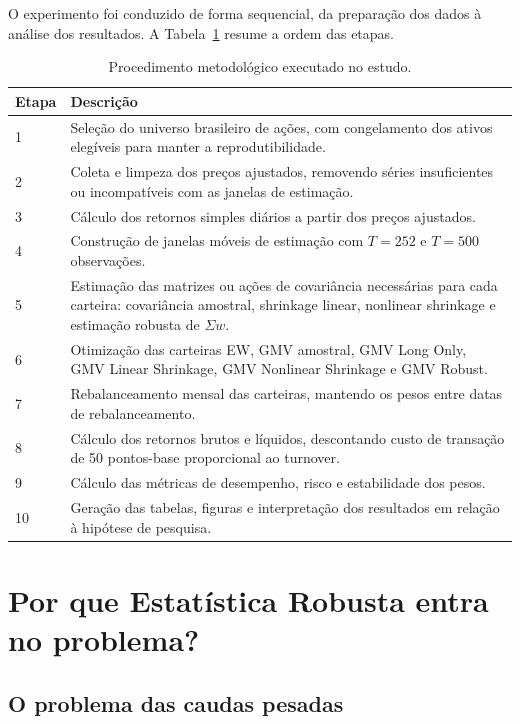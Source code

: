 \documentclass[12pt,a4paper]{article}
\begin{document}
O experimento foi conduzido de forma sequencial, da preparação dos dados à análise dos
resultados. A Tabela~\ref{tab:procedimento-metodologico} resume a ordem das etapas.

\begin{longtable}{p{}p{}}
\caption{Procedimento metodológico executado no estudo.}
\label{tab:procedimento-metodologico}\\
\toprule
\textbf{Etapa} & \textbf{Descrição} \\
\midrule
1 & Seleção do universo brasileiro de ações, com congelamento dos ativos elegíveis para manter a reprodutibilidade. \\
2 & Coleta e limpeza dos preços ajustados, removendo séries insuficientes ou incompatíveis com as janelas de estimação. \\
3 & Cálculo dos retornos simples diários a partir dos preços ajustados. \\
4 & Construção de janelas móveis de estimação com $T=252$ e $T=500$ observações. \\
5 & Estimação das matrizes ou ações de covariância necessárias para cada carteira: covariância amostral, shrinkage linear, nonlinear shrinkage e estimação robusta de $\Sigma w$. \\
6 & Otimização das carteiras EW, GMV amostral, GMV Long Only, GMV Linear Shrinkage, GMV Nonlinear Shrinkage e GMV Robust. \\
7 & Rebalanceamento mensal das carteiras, mantendo os pesos entre datas de rebalanceamento. \\
8 & Cálculo dos retornos brutos e líquidos, descontando custo de transação de 50 pontos-base proporcional ao turnover. \\
9 & Cálculo das métricas de desempenho, risco e estabilidade dos pesos. \\
10 & Geração das tabelas, figuras e interpretação dos resultados em relação à hipótese de pesquisa. \\
\bottomrule
\end{longtable}

\section{Por que Estatística Robusta entra no problema?}

\subsection{O problema das caudas pesadas}
\end{document}
